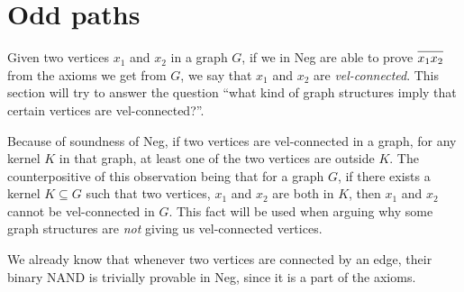 \section{Odd paths}
\label{sec:Odd paths}
Given two vertices $x_1$ and $x_2$ in a graph $G$, if we in Neg are able to prove $\ol{x_1x_2}$ from the axioms we get from $G$, we say that $x_1$ and $x_2$ are \textit{vel-connected}.
This section will try to answer the question ``what kind of graph structures imply that certain vertices are vel-connected?''.

Because of soundness of Neg, if two vertices are vel-connected in a graph, for any kernel $K$ in that graph, at least one of the two vertices are outside $K$.
The counterpositive of this observation being that for a graph $G$, if there exists a kernel $K \subseteq G$ such that two vertices, $x_1$ and $x_2$ are both in $K$, then $x_1$ and $x_2$ cannot be vel-connected in $G$.
This fact will be used when arguing why some graph structures are \textit{not} giving us vel-connected vertices.

We already know that whenever two vertices are connected by an edge, their binary NAND is trivially provable in Neg, since it is a part of the axioms.

